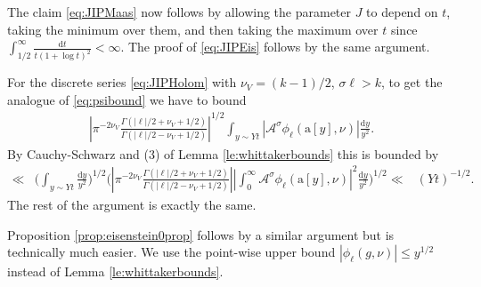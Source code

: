 \documentclass[12pt]{amsart}
\theoremstyle{definition}
\theoremstyle{remark}
\numberwithin{equation}{section}
\newcommand{\1}{{\mathbf 1}}
\renewcommand{\a}{\mathrm{a}}
\renewcommand{\d}{\mathrm d}
\begin{document}
The claim \eqref{eq:JIPMaas} now follows by allowing the parameter $J$ to depend on $t$, taking the minimum over them, and then taking the maximum over $t$ since $\int_{1/2}^\infty \frac{\d t}{t (1+\log t)^2} < \infty$. The proof of \eqref{eq:JIPEis} follows by the same argument.

For the discrete series \eqref{eq:JIPHolom} with $\nu_V=(k-1)/2$, $\sigma \ell > k$, to get the analogue of \eqref{eq:psibound} we have to bound
\begin{align*}  \left|\pi^{-2\nu_V}\frac{\Gamma(|\ell|/2+\nu_V+1/2)}{\Gamma(|\ell|/2-\nu_V+1/2)} \right|^{1/2}  \int_{y\sim Yt} \left| \mathcal{A}^{\sigma} \phi_\ell(\a[y] ,\nu)\right| \frac{\d y}{y^2}.
\end{align*}
By Cauchy-Schwarz and (3) of Lemma \ref{le:whittakerbounds} this is bounded by
\begin{align*}
    \ll & \bigg( \int_{y\sim Yt} \frac{\d y}{y^2} \bigg)^{1/2} \bigg(  \left|\pi^{-2\nu_V}\frac{\Gamma(|\ell|/2+\nu_V+1/2)}{\Gamma(|\ell|/2-\nu_V+1/2)} \right|   \left| \int_0^\infty\mathcal{A}^{\sigma} \phi_\ell(\a[y] ,\nu)\right|^2 \frac{\d y}{y^2}\bigg)^{1/2} 
    \ll & (Yt)^{-1/2}.
\end{align*}
The rest of the argument is exactly the same.

Proposition \ref{prop:eisenstein0prop} follows by a similar argument but is technically much easier. We use the point-wise upper bound $|\phi_\ell(g,\nu)| \leq y^{1/2}$ instead of Lemma \ref{le:whittakerbounds}.
\end{document}
